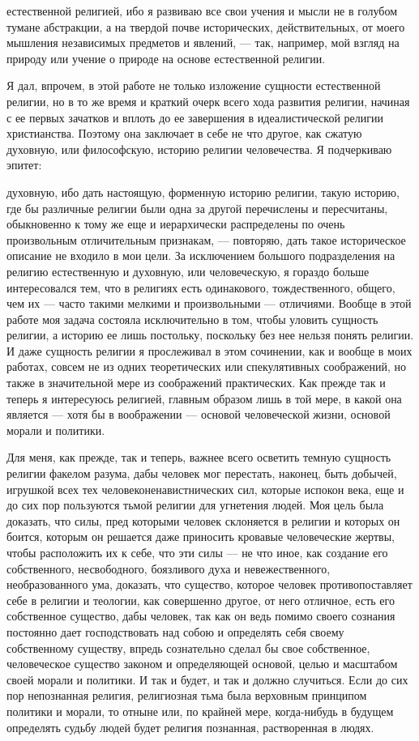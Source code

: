 \documentclass[12pt]{article}
\begin{document}
естественной религией, ибо я развиваю все свои учения и мысли не в голубом тумане абстракции, а на твердой почве исторических, действительных, от моего мышления независимых предметов и явлений, --- так, например, мой взгляд на природу или учение о природе на основе естественной религии. 

Я дал, впрочем, в этой работе не только изложение сущности естественной религии, но в то же время и краткий очерк всего хода развития религии, начиная с ее первых зачатков и вплоть до ее завершения в идеалистической религии христианства. Поэтому она заключает в себе не что другое, как сжатую духовную, или философскую, историю религии человечества. Я подчеркиваю эпитет: 

духовную, ибо дать настоящую, форменную историю религии, такую историю, где бы различные религии были одна за другой перечислены и пересчитаны, обыкновенно к тому же еще и иерархически распределены по очень произвольным отличительным признакам, --- повторяю, дать такое историческое описание не входило в мои цели. За исключением большого подразделения на религию естественную и духовную, или человеческую, я гораздо больше интересовался тем, что в религиях есть одинакового, тождественного, общего, чем их --- часто такими мелкими и произвольными --- отличиями. Вообще в этой работе моя задача состояла исключительно в том, чтобы уловить сущность религии, а историю ее лишь постольку, поскольку без нее нельзя понять религии. И даже сущность религии я прослеживал в этом сочинении, как и вообще в моих работах, совсем не из одних теоретических или спекулятивных соображений, но также в значительной мере из соображений практических. Как прежде так и теперь я интересуюсь религией, главным образом лишь в той мере, в какой она является --- хотя бы в воображении --- основой человеческой жизни, основой морали и политики. 

Для меня, как прежде, так и теперь, важнее всего осветить темную сущность религии факелом разума, дабы человек мог перестать, наконец, быть добычей, игрушкой всех тех человеконенавистнических сил, которые испокон века, еще и до сих пор пользуются тьмой религии для угнетения людей. Моя цель была доказать, что силы, пред которыми человек склоняется в религии и которых он боится, которым он решается даже приносить кровавые человеческие жертвы, чтобы расположить их к себе, что эти силы --- не что иное, как создание его собственного, несвободного, боязливого духа и невежественного, необразованного ума, доказать, что существо, которое человек противопоставляет себе в религии и теологии, как совершенно другое, от него отличное, есть его собственное существо, дабы человек, так как он ведь помимо своего сознания постоянно дает господствовать над собою и определять себя своему собственному существу, впредь сознательно сделал бы свое собственное, человеческое существо законом и определяющей основой, целью и масштабом своей морали и политики. И так и будет, и так и должно случиться. Если до сих пор непознанная религия, религиозная тьма была верховным принципом политики и морали, то отныне или, по крайней мере, когда-нибудь в будущем определять судьбу людей будет религия познанная, растворенная в людях. 
\end{document}
